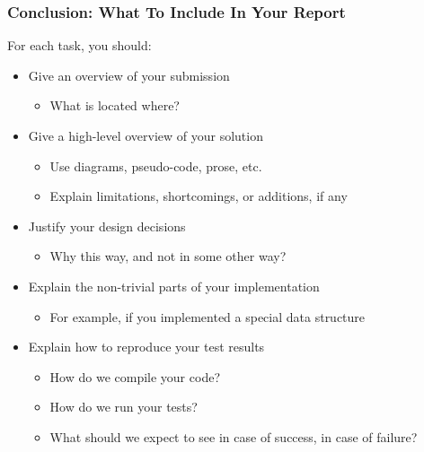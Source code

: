 \begin{frame}

\frametitle{Conclusion: What To Include In Your Report}

For each task, you should:

\begin{itemize}

\item Give an overview of your submission

\begin{itemize}

\footnotesize

\item What is located where?

\end{itemize}

\item Give a high-level overview of your solution

\begin{itemize}

\footnotesize

\item Use diagrams, pseudo-code, prose, etc.

\item Explain limitations, shortcomings, or additions, if any

\end{itemize}

\item Justify your design decisions

\begin{itemize}

\footnotesize

\item Why this way, and not in some other way?

\end{itemize}

\item Explain the non-trivial parts of your implementation

\begin{itemize}

\footnotesize

\item For example, if you implemented a special data structure

\end{itemize}

\item Explain how to reproduce your test results

\begin{itemize}

\footnotesize

\item How do we compile your code?

\item How do we run your tests?

\item What should we expect to see in case of success, in case of
failure?

\end{itemize}

\end{itemize}

\end{frame}
